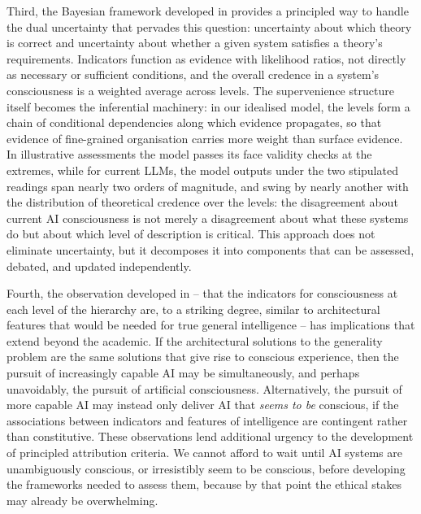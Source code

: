 \documentclass[11pt, a4paper, onecolumn, gdm]{google}
\begin{document}
Third, the Bayesian framework developed in  provides a principled way to handle the dual uncertainty that pervades this question: uncertainty about which theory is correct and uncertainty about whether a given system satisfies a theory's requirements.
Indicators function as evidence with likelihood ratios, not directly as necessary or sufficient conditions, and the overall credence in a system's consciousness is a weighted average across levels.
The supervenience structure itself becomes the inferential machinery: in our idealised model, the levels form a chain of conditional dependencies along which evidence propagates, so that evidence of fine-grained organisation carries more weight than surface evidence.
In illustrative assessments the model passes its face validity checks at the extremes, while for current LLMs, the model outputs under the two stipulated readings span nearly two orders of magnitude, and swing by nearly another with the distribution of theoretical credence over the levels: the disagreement about current AI consciousness is not merely a disagreement about what these systems do but about which level of description is critical.
This approach does not eliminate uncertainty, but it decomposes it into components that can be assessed, debated, and updated independently.

Fourth, the observation developed in  -- that the indicators for consciousness at each level of the hierarchy are, to a striking degree, similar to architectural features that would be needed for true general intelligence -- has implications that extend beyond the academic.
If the architectural solutions to the generality problem are the same solutions that give rise to conscious experience, then the pursuit of increasingly capable AI may be simultaneously, and perhaps unavoidably, the pursuit of artificial consciousness.
Alternatively, the pursuit of more capable AI may instead only deliver AI that \emph{seems to be} conscious, if the associations between indicators and features of intelligence are contingent rather than constitutive. These observations lend additional urgency to the development of principled attribution criteria.
We cannot afford to wait until AI systems are unambiguously conscious, or irresistibly seem to be conscious, before developing the frameworks needed to assess them, because by that point the ethical stakes may already be overwhelming.
\end{document}
